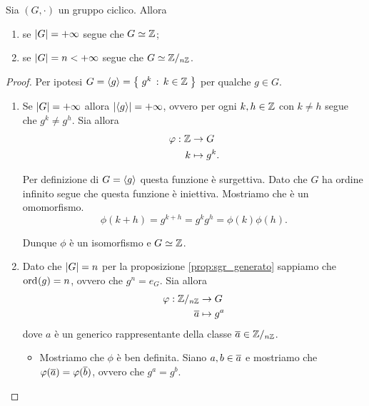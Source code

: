 \begin{theorem}
    \label{th:iso_ciclico}
    Sia $(G, \cdot)$ un gruppo ciclico. Allora \begin{enumerate}[label={(\roman*)}, ref={\thetheorem: (\roman*)}]
        \item se $\abs G = +\infty$ segue che $G \isomorph \Z$;
        \item se $\abs G = n < +\infty$ segue che $G \isomorph \Zmod n$.
    \end{enumerate}
\end{theorem}
\begin{proof}
    Per ipotesi $G = \cycl*{g} = \set{g^k \suchthat k \in \Z}$ per qualche $g \in G$.
    \begin{enumerate}[label={(\roman*)}]
        \item Se $\abs G = +\infty$ allora $\abs*{\cycl*{g}} = +\infty$, ovvero per ogni $k, h \in \Z$ con $k \neq h$ segue che $g^k \neq g^h$. Sia allora \begin{align*}
            \phi : \Z &\to G\\
            k &\mapsto g^k.
        \end{align*}

        Per definizione di $G = \cycl{g}$ questa funzione è surgettiva. Dato che $G$ ha ordine infinito segue che questa funzione è iniettiva. Mostriamo che è un omomorfismo. \[
            \phi(k + h) = g^{k + h} = g^kg^h = \phi(k)\phi(h).    
        \]

        Dunque $\phi$ è un isomorfismo e $G \isomorph \Z$.
        \item Dato che $\abs{G} = n$ per la proposizione \ref{prop:sgr_generato} sappiamo che $\ord g = n$, ovvero che $g^n = e_G$. Sia allora \begin{align*}
            \phi : \Zmod n &\to G\\
            \eqclass a &\mapsto g^a
        \end{align*} dove $a$ è un generico rappresentante della classe $\eqclass a \in \Zmod n$. \begin{itemize}
            \item Mostriamo che $\phi$ è ben definita. Siano $a, b \in \eqclass a$ e mostriamo che $\phi(\eqclass a) = \phi(\eqclass b)$, ovvero che $g^a = g^b$. 
            

\end{itemize}
\end{enumerate}
\end{proof}
